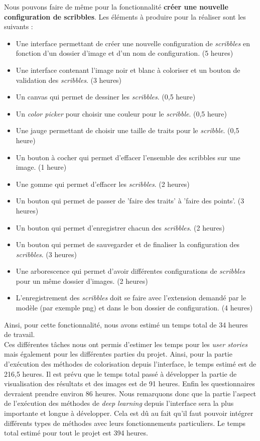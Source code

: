 \documentclass{article}
\begin{document}
Nous pouvons faire de même pour la fonctionnalité \textbf{créer une nouvelle configuration de scribbles}.
Les éléments à produire pour la réaliser sont les suivants :
\begin{itemize}
    \item Une interface permettant de créer une nouvelle configuration de \textit{scribbles} en fonction d'un dossier d'image et d'un nom de configuration. (5 heures)
    \item Une interface contenant l'image noir et blanc à coloriser et un bouton de validation des \textit{scribbles}. (3 heures)
    \item Un canvas qui permet de dessiner les \textit{scribbles}. (0,5 heure)
    \item Un \textit{color picker} pour choisir une couleur pour le \textit{scribble}. (0,5 heure)
    \item Une jauge permettant de choisir une taille de traits pour le \textit{scribble}. (0,5 heure)
    \item Un bouton à cocher qui permet d'effacer l'ensemble des scribbles sur une image. (1 heure)
    \item Une gomme qui permet d'effacer les \textit{scribbles}. (2 heures)
    \item Un bouton qui permet de passer de 'faire des traits' à 'faire des points'. (3 heures)
    \item Un bouton qui permet d'enregistrer chacun des \textit{scribbles}. (2 heures)
    \item Un bouton qui permet de sauvegarder et de finaliser la configuration des \textit{scribbles}. (3 heures)
    \item Une arborescence qui permet d'avoir différentes configurations de \textit{scribbles} pour un même dossier d'images. (2 heures)
    \item L'enregistrement des \textit{scribbles} doit se faire avec l'extension demandé par le modèle (par exemple png) et dans le bon dossier de configuration. (4 heures)
\end{itemize}

Ainsi, pour cette fonctionnalité, nous avons estimé un temps total de 34 heures de travail.\\

Ces différentes tâches nous ont permis d'estimer les temps pour les \textit{user stories} mais également pour les différentes parties du projet.
Ainsi, pour la partie d'exécution des méthodes de colorisation depuis l'interface, le temps estimé est de 216,5 heures.
Il est prévu que le temps total passé à développer la partie de visualisation des résultats et des images est de 91 heures.
Enfin les questionnaires devraient prendre environ 86 heures.
Nous remarquons donc que la partie l'aspect de l'exécution des méthodes de \textit{deep learning} depuis l'interface sera la plus importante et 
longue à développer. Cela est dû au fait qu'il faut pouvoir intégrer différents types de méthodes avec leurs fonctionnements particuliers.
Le temps total estimé pour tout le projet est 394 heures. \\
\end{document}
